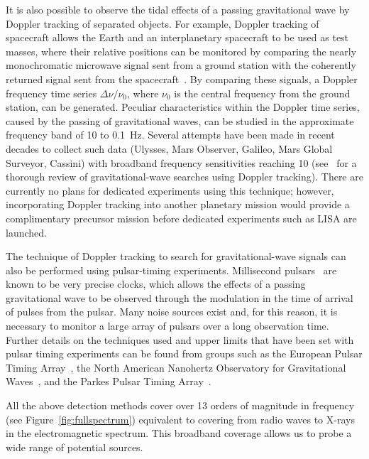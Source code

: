 It is also possible to observe the tidal effects of a passing gravitational
wave by Doppler tracking of separated objects. For example, Doppler tracking of
spacecraft allows the Earth and an interplanetary spacecraft to be used as test
masses, where their relative positions can be monitored by comparing the nearly
monochromatic microwave signal sent from a ground station with the coherently
returned signal sent from the spacecraft~\cite{Estabrook:1975}. By comparing
these signals, a Doppler frequency time series $\Delta \nu / \nu_0$, where
$\nu_0$ is the central frequency from the ground station, can be generated.
Peculiar characteristics within the Doppler time series, caused by the passing
of gravitational waves, can be studied in the approximate frequency band of
10 to 0.1~Hz. Several attempts have been made in recent decades to
collect such data (Ulysses, Mars Observer, Galileo, Mars Global Surveyor,
Cassini) with broadband frequency sensitivities reaching 10
(see~\cite{Armstrong:2006} for a thorough review of gravitational-wave
searches using Doppler tracking). There are currently no plans for
dedicated experiments using this technique; however, incorporating
Doppler tracking into another planetary mission would provide a
complimentary precursor mission before dedicated experiments such as
LISA are launched.


The technique of Doppler tracking to search for gravitational-wave signals can
also be performed using pulsar-timing experiments.  Millisecond
pulsars~\cite{Lorimer:2008} are known to be very precise clocks, which
allows the effects of a passing gravitational wave to be observed
through the modulation in the time of arrival of pulses from the
pulsar. Many noise sources exist and, for this reason, it is necessary
to monitor a large array of pulsars over a long observation time.
Further details on the techniques used and upper limits that have been
set with pulsar timing experiments can be found from groups such as
the European Pulsar Timing Array~\cite{Janssen:2008}, the North
American Nanohertz Observatory for Gravitational
Waves~\cite{Jenet:2006,Jenet:2009}, and the Parkes Pulsar Timing
Array~\cite{Hobbs:2008}.


All the above detection methods cover over 13 orders of magnitude in frequency
(see Figure~\ref{fig:fullspectrum}) equivalent to covering from radio waves to
X-rays in the electromagnetic spectrum.  This broadband coverage allows us to
probe a wide range of potential sources.

